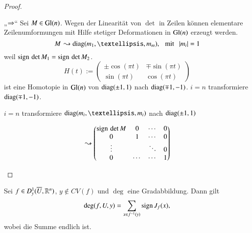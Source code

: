 \begin{proof}
    \begin{description}
    \item{„$\Rightarrow$“} Sei $M\in \mathrm{Gl}(n)$. Wegen der Linearität von $\det $ in Zeilen können elementare
    Zeilenumformungen mit Hilfe stetiger Deformationen in $\mathrm{Gl}(n)$ erzeugt werden.
    \[
        M \, \leadsto\diag(m_1,…,m_m), \qq \text{mit} \qq |m_i|=1
    \]
    weil $\mathrm{sign}\, \det M_1=\mathrm{sign}\, \det M_2$.
    \[
        H(t):= \begin{pmatrix} \pm \cos (\pi t)& \mp \sin(\pi t)\\ \sin(\pi t) & \cos(\pi t)\end{pmatrix}
    \]
    ist eine Homotopie in $\mathrm{Gl}(n)$ von $\mathrm{diag}(\pm 1,1)$ nach $\mathrm{diag}(\mp 1,-1)$. $i=n$ transformiere
    $\mathrm{diag}(\mp 1,-1)$.

    \noindent $i=n$ transformiere $\diag(m_i,…,m_i)$ nach $\mathrm{diag}(\pm1,1)$

    \[
        \leadsto \begin{pmatrix} \mathrm{sign}\,\det M& 0& \cdots&0\\ 0& 1 &\cdots&0\\\vdots&&\ddots&0\\ 0&\cdots&
        \cdots& 1\end{pmatrix}
    \]

    \end{description}
\end{proof}

\begin{theorem}
    Sei $f\in D_y^1(\overline U, \mathbb{R}^n)$, $y\nin CV(f)$ und $\deg$ eine Gradabbildung. Dann gilt
    \[
        \deg(f,U,y)=\sum_{x\in f^{-1}(y)} \mathrm{sign}\, J_f(x),
    \]
    wobei die Summe endlich ist.
\end{theorem}

